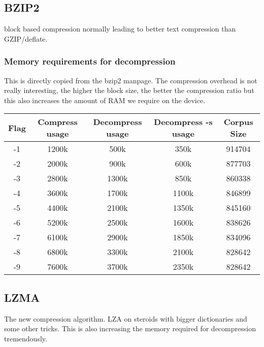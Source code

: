 \documentclass{article}
\begin{document}
\subsection{BZIP2}
block based compression normally leading to better text compression than GZIP/deflate.

\subsubsection{Memory requirements for decompression}
This is directly copied from the bzip2 manpage. The compression overhead is not
really interesting, the higher the block size, the better the compression ratio but
this also increases the amount of RAM we require on the device.
\begin{tabular}{|c|c|c|c|c|}
\hline
Flag & Compress usage & Decompress usage & Decompress -s usage & Corpus Size \\ \hline
-1   &   1200k  &     500k    &     350k  &    914704 \\ \hline
-2   &   2000k  &     900k    &     600k  &    877703 \\ \hline 
-3   &   2800k  &    1300k    &     850k  &    860338 \\ \hline
-4   &   3600k  &    1700k    &    1100k  &    846899 \\ \hline
-5   &   4400k  &    2100k    &    1350k  &    845160 \\ \hline
-6   &   5200k  &    2500k    &    1600k  &    838626 \\ \hline
-7   &   6100k  &    2900k    &    1850k  &    834096 \\ \hline
-8   &   6800k  &    3300k    &    2100k  &    828642 \\ \hline
-9   &   7600k  &    3700k    &    2350k  &    828642 \\ \hline
\end{tabular}

\subsection{LZMA}
The new compression algorithm. LZA on steroids with bigger dictionaries and some
other tricks. This is also increasing the memory required for decompression
tremendously.
\end{document}
